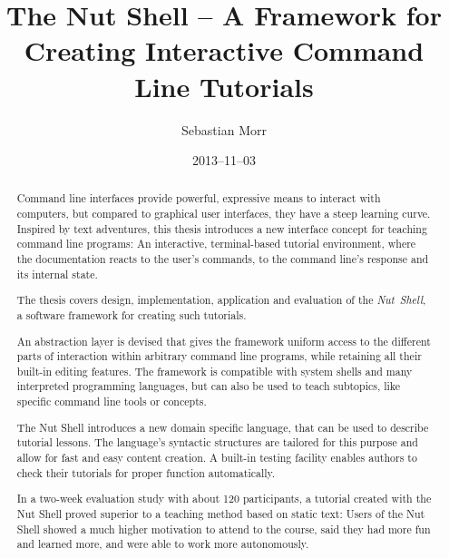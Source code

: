 \documentclass[paper=a4,twoside,abstract=on,cleardoublepage=empty,numbers=noenddot,toc=bib,12pt,appendixprefix=true]{scrreprt}
\title{The Nut Shell -- A Framework for Creating Interactive Command Line Tutorials}
\author{Sebastian Morr}
\date{2013--11--03}
\begin{document}
\maketitle
\restoregeometry

\begin{abstract}
    Command line interfaces provide powerful, expressive means to interact with computers, but compared to graphical user interfaces, they have a steep learning curve. Inspired by text adventures, this thesis introduces a new interface concept for teaching command line programs: An interactive, terminal-based tutorial environment, where the documentation reacts to the user's commands, to the command line's response and its internal state.

    The thesis covers design, implementation, application and evaluation of the \emph{Nut~Shell}, a software framework for creating such tutorials.

    An abstraction layer is devised that gives the framework uniform access to the different parts of interaction within arbitrary command line programs, while retaining all their built-in editing features. The framework is compatible with system shells and many interpreted programming languages, but can also be used to teach subtopics, like specific command line tools or concepts.

    The Nut Shell introduces a new domain specific language, that can be used to describe tutorial lessons. The language's syntactic structures are tailored for this purpose and allow for fast and easy content creation. A built-in testing facility enables authors to check their tutorials for proper function automatically.

    In a two-week evaluation study with about 120 participants, a tutorial created with the Nut Shell proved superior to a teaching method based on static text: Users of the Nut Shell showed a much higher motivation to attend to the course, said they had more fun and learned more, and were able to work more autonomously.
\end{abstract}
\end{document}
